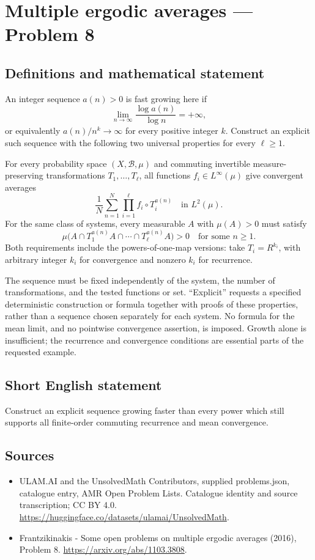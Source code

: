 \documentclass[11pt,a4paper]{article}
\begin{document}
\section*{Multiple ergodic averages — Problem 8}\label{statement}

\subsection{Definitions and mathematical statement}
An integer sequence $a(n)>0$ is fast growing here if
\[
       \lim_{n\to\infty}\frac{\log a(n)}{\log n}=+\infty,
\]
or equivalently $a(n)/n^k\to\infty$ for every positive
integer $k$. Construct an explicit such sequence with
the following two universal properties for every $\ell\ge1$.

For every probability space $(X,\mathcal B,\mu)$ and
commuting invertible measure-preserving transformations
$T_1,\ldots,T_\ell$, all functions $f_i\in L^\infty(\mu)$
give convergent averages
\[
       \frac1N\sum_{n=1}^N\prod_{i=1}^{\ell}
                     f_i\circ T_i^{a(n)}
                \quad\text{in }L^2(\mu).
\]
For the same class of systems, every measurable $A$ with
$\mu(A)>0$ must satisfy
\[
       \mu\bigl(A\cap T_1^{a(n)}A\cap\cdots
                        \cap T_\ell^{a(n)}A\bigr)>0
       \quad\text{for some }n\ge1.
\]
Both requirements include the powers-of-one-map versions:
take $T_i=R^{k_i}$, with arbitrary integer $k_i$ for
convergence and nonzero $k_i$ for recurrence.

The sequence must be fixed independently of the system,
the number of transformations, and the tested functions
or set. ``Explicit'' requests a specified deterministic
construction or formula together with proofs of these
properties, rather than a sequence chosen separately for
each system. No formula for the mean limit, and no
pointwise convergence assertion, is imposed. Growth alone
is insufficient; the recurrence and convergence conditions
are essential parts of the requested example.
\subsection{Short English statement}
Construct an explicit sequence growing faster than every power which still supports all finite-order commuting recurrence and mean convergence.
\subsection{Sources}
\begin{itemize}
\item[S1] ULAM.AI and the UnsolvedMath Contributors, supplied problems.json, catalogue entry, AMR Open Problem Lists. Catalogue identity and source transcription; CC BY 4.0.
\url{https://huggingface.co/datasets/ulamai/UnsolvedMath}.
\item[S2] Frantzikinakis - Some open problems on multiple ergodic averages (2016), Problem 8. 
\url{https://arxiv.org/abs/1103.3808}.
\end{itemize}
\end{document}
